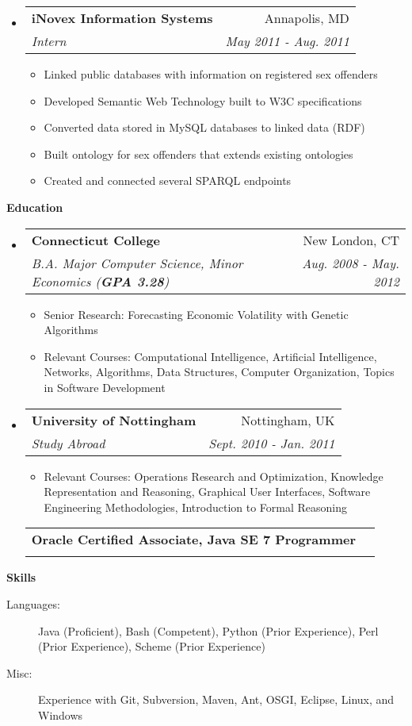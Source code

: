 \documentclass[letterpaper,11pt]{article}
\makeatletter
\newcommand{\resitem}[1]{\item #1 \vspace{-2pt}}
\newcommand{\resheading}[1]{{\large \colorbox{mygrey}{\begin{minipage}{\textwidth}{\textbf{#1 \vphantom{p\^{E}}}}\end{minipage}}}}
\newcommand{\ressubheading}[4]{
\begin{tabular*}{7.0in}{l@{\extracolsep{\fill}}r}
		\textbf{#1} & #2 \\
		\textit{#3} & \textit{#4} \\
\end{tabular*}\vspace{-6pt}}
\makeatother
\begin{document}
\begin{itemize}
	\item
	\ressubheading{iNovex Information Systems}{Annapolis, MD}{Intern}{May 2011 - Aug. 2011}
	\begin{itemize}
		\resitem{Linked public databases with information on registered sex offenders}
		\resitem{Developed Semantic Web Technology built to W3C specifications}
		\resitem{Converted data stored in MySQL databases to linked data (RDF)}
		\resitem{Built ontology for sex offenders that extends existing ontologies}
		\resitem{Created and connected several SPARQL endpoints}
	\end{itemize}
\end{itemize}

\resheading{Education}
\begin{itemize}
	\item
	\ressubheading{Connecticut College}{New London, CT}{B.A. Major Computer Science, Minor Economics (\textbf{GPA 3.28})}{Aug. 2008 - May. 2012}
	\begin{itemize}
		\resitem{Senior Research: Forecasting Economic Volatility with Genetic Algorithms}
		\resitem{Relevant Courses: Computational Intelligence, Artificial Intelligence, Networks, Algorithms, Data Structures, Computer Organization, Topics in Software Development}
	\end{itemize}
	
	\item
	\ressubheading{University of Nottingham}{Nottingham, UK}{Study Abroad}{Sept. 2010 - Jan. 2011}
	\begin{itemize}
		\resitem{Relevant Courses: Operations Research and Optimization, Knowledge Representation and Reasoning, Graphical User Interfaces, Software Engineering Methodologies, Introduction to Formal Reasoning}
	\end{itemize}
	\ressubheading{Oracle Certified Associate, Java SE 7 Programmer}{}{}{}
\end{itemize}

\resheading{Skills}
\begin{description}
	\item[Languages:]
		Java (Proficient), Bash (Competent), Python (Prior Experience), Perl (Prior Experience), Scheme (Prior Experience)
	\item[Misc:]
		Experience with Git, Subversion, Maven, Ant, OSGI, Eclipse, Linux, and Windows
\end{description}
\end{document}
